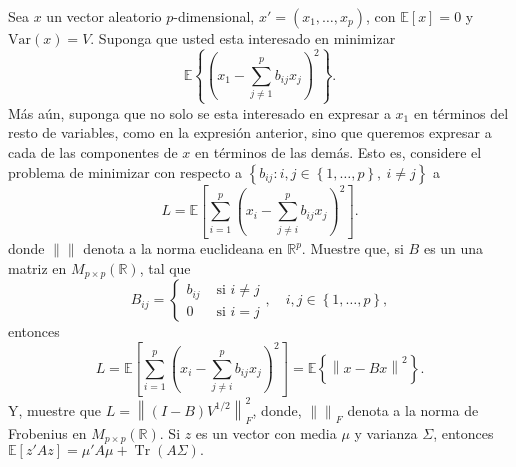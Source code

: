 \documentclass[10.5pt,notitlepage]{article}
\renewcommand{\qedsymbol}{$\blacksquare$}
\DeclareMathOperator{\Tr}{Tr}
\newcommand{\RR}{\mathbb{R}}
\newcommand{\EE}{\mathbb{E}}
\newcommand{\Var}{\mathrm{Var}}
\newcommand{\norm}[1]{\left\| #1 \right\|}
\newcommand{\corch}[1]{\left[ #1 \right]}
\newcommand{\kis}[1]{\left\{ #1 \right\}}
\newcommand{\pare}[1]{\left( #1 \right)}
\theoremstyle{plain}
\newenvironment{rem}
  {\pushQED{\qed}\renewcommand{\qedsymbol}{$\triangle$}\remarkex}
  {\popQED\endremarkex}
\begin{document}
\setcounter{exo}{0}
\begin{exo}
Sea \(x\) un vector aleatorio \(p\)-dimensional, \(x' = (x_1, \hdots, x_p)\), con \(\EE[x]=0\) y \(\Var(x) = V\). Suponga que usted esta interesado en minimizar 
\[
\EE\kis{ \pare{x_1 - \sum_{j \neq 1}^{p}b_{ij}x_j}^2 }.
\]
Más aún, suponga que no solo se esta interesado en expresar a \(x_1\) en términos del resto de variables, como  en la expresión anterior, sino que queremos expresar a cada de las componentes de \(x\) en términos de las demás. Esto es, considere el problema de minimizar con respecto a  \(\kis{b_{ij} : i,j \in\kis{1,\hdots,p}, \ i \neq j}\) a 
\[
L = \EE\corch{\sum_{i = 1}^{p}\pare{x_i - \sum_{j \neq i}^{p}b_{ij}x_j}^2}.
\]
donde \(\norm{}\) denota a la norma euclideana en \(\RR^p\). Muestre que, si \(B\) es un una matriz en \(M_{p\times p}(\RR)\), tal que 
\[
B_{ij} = \begin{cases}
b_{ij} & \text{ si } i\neq j \\ 
0 & \text{ si } i = j 
\end{cases}, \quad i,j \in \kis{1, \hdots ,p},
\]
entonces
\[
L = \EE\corch{\sum_{i = 1}^{p}\pare{x_i - \sum_{j \neq i}^{p}b_{ij}x_j}^2} = \EE\kis{\norm{x - Bx}^2}.
\]
Y, muestre que \(L = \norm{(I-B)V^{1/2}}_{F}^2\), donde, \(\norm{}_{F}\) denota a la norma de Frobenius en \(M_{p \times p}(\RR)\). 
\begin{rem}\label{rem2}
Si \(z\) es un vector con media \(\mu\) y varianza \(\Sigma\), entonces \(\EE[z'A z] = \mu' A \mu + \Tr(A \Sigma ).\)
\end{rem}
\end{exo}
\end{document}
